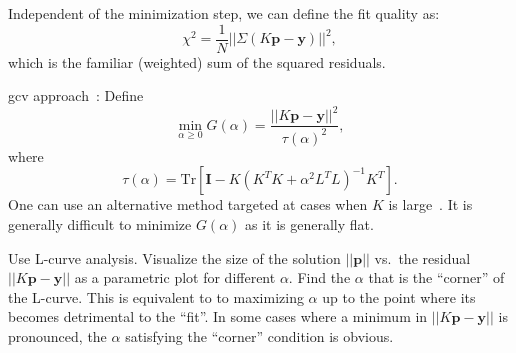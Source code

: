 Independent of the minimization step, we can define the fit quality as:
\begin{equation}
   \chi^{2} = \frac{1}{N}|| \Sigma \left ( K \mathbf{p} - \mathbf{y} \right ) ||^{2} ,
\end{equation}
which is the familiar (weighted) sum of the squared residuals.




\gls{gcv} approach~\cite{1978-Craven-NM-31-377}:
Define
\begin{equation}
\label{eq:gcv}
   \min_{\alpha \geq 0} G ( \alpha ) = \frac{ || K \mathbf{p} - \mathbf{y} ||^{2} }{ \tau ( \alpha )^{2} } ,
\end{equation}
where
\begin{equation}
   \tau ( \alpha ) = \mathrm{Tr} \left [ \mathbf{I} - K \left ( K^{T} K + \alpha^{2} L^{T} L \right )^{-1} K^{T} \right ] .
\end{equation}
One can use an alternative method targeted at cases when $K$ is large~\cite{1997-Golub-JCGS-6-1}.
It is generally difficult to minimize $G ( \alpha )$ as it is generally flat.



Use L-curve analysis.
Visualize the size of the solution $|| \mathbf{p} ||$ vs.\ the residual $|| K \mathbf{p} - \mathbf{y} ||$ as a parametric plot for different $\alpha$.
Find the $\alpha$ that is the ``corner'' of the L-curve.
This is equivalent to to maximizing $\alpha$ up to the point where its becomes detrimental to the ``fit''.
In some cases where a minimum in $|| K \mathbf{p} - \mathbf{y} ||$ is pronounced, the $\alpha$ satisfying the ``corner'' condition is obvious.